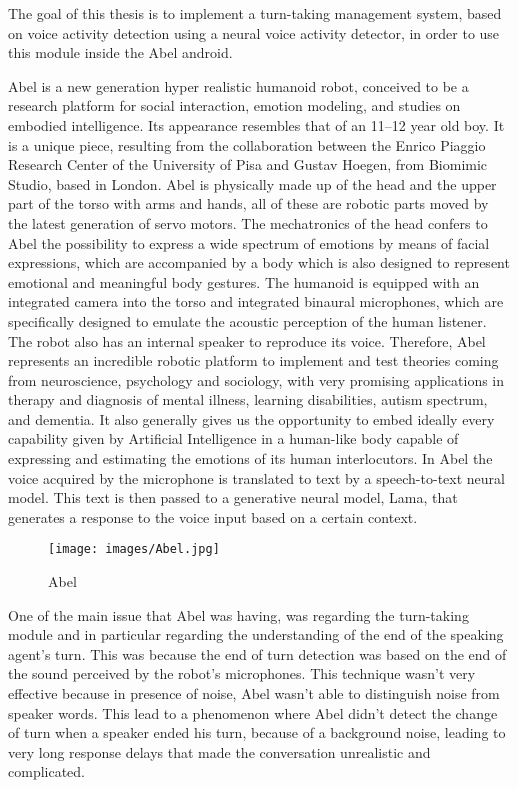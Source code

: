 \documentclass[../main.tex]{subfiles}
\begin{document}
The goal of this thesis is to implement a turn-taking management system, based on voice activity detection using a neural voice activity detector, in order to use this module inside the Abel android. 

Abel is a new generation hyper realistic humanoid robot, conceived to be a research platform for social interaction, emotion modeling, and studies on embodied intelligence. Its appearance resembles that of an 11–12 year old boy. It is a unique piece, resulting from the collaboration between the Enrico Piaggio Research Center of the University of Pisa and Gustav Hoegen, from Biomimic Studio, based in London. Abel is physically made up of the head and the upper part of the torso with arms and hands, all of these are robotic parts moved by the latest generation of servo motors. The mechatronics of the head confers to Abel the possibility to express a wide spectrum of emotions by means of facial expressions, which are accompanied by a body which is also designed to represent emotional and meaningful body gestures.
The humanoid is equipped with an integrated camera into the torso and integrated binaural microphones, which are specifically designed to emulate the acoustic perception of the human listener. The robot also has an internal speaker to reproduce its voice. Therefore, Abel represents an incredible robotic platform to implement and test theories coming
from neuroscience, psychology and sociology, with very promising applications in therapy and
diagnosis of mental illness, learning disabilities, autism spectrum, and dementia.
It also generally gives us the opportunity to embed ideally every capability given by Artificial
Intelligence in a human-like body capable of expressing and estimating the emotions of its human
interlocutors. In Abel the voice acquired by the microphone is translated to text by a speech-to-text neural model. This text is then passed to a generative neural model, Lama, that generates a response to the voice input based on a certain context.  

\begin{figure}[ht]
    \centering
    \texttt{[image: images/Abel.jpg]}
    \caption{Abel}
    \label{fig:abel}
\end{figure}

One of the main issue that Abel was having, was regarding the turn-taking module and in particular regarding the understanding of the end of the speaking agent's turn. This was because the end of turn detection was based on the end of the sound perceived by the robot's microphones. This technique wasn't very effective because in presence of noise, Abel wasn't able to distinguish noise from speaker words. This lead to a phenomenon where Abel didn't detect the change of turn when a speaker ended his turn, because of a background noise, leading to very long response delays that made the conversation unrealistic and complicated. 
\end{document}
